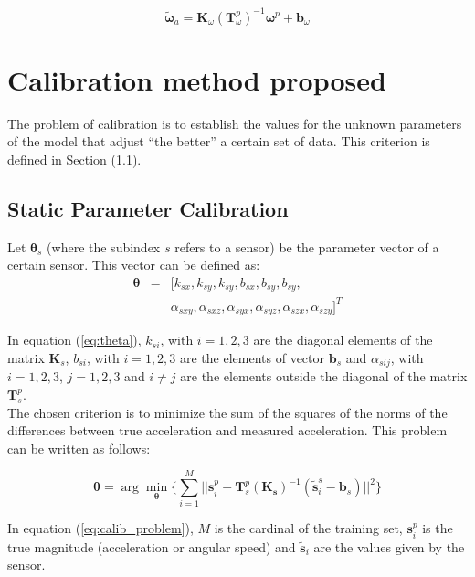 \documentclass[conference]{IEEEtran}
\newcommand{\refp}[1]{(\ref{#1})}
\begin{document}
\begin{equation}
\tilde{\boldsymbol{\omega}}_a = \mathbf{K}_{\omega}(\mathbf{T}_{\omega}^p)^{-1}\boldsymbol{\omega}^p+\mathbf{b}_{\omega}
\end{equation}

\section{Calibration method proposed}
The problem of calibration is to establish the values for the unknown parameters of the model that adjust ``the better'' a certain set of data. This criterion is defined in Section \refp{sec:param}. 


\subsection{Static Parameter Calibration}
\label{sec:param}

Let $\boldsymbol{\theta}_s$ (where the subindex $s$ refers to a sensor) be the parameter vector of a certain sensor. This vector can be defined as:
\begin{eqnarray}
\boldsymbol{\theta} &=& [k_{sx},k_{sy},k_{sy},b_{sx},b_{sy},b_{sy},\\ \nonumber
&&\alpha_{sxy},\alpha_{sxz},\alpha_{syx},\alpha_{syz},\alpha_{szx},\alpha_{szy}]^T
\label{eq:theta}
\end{eqnarray}

In equation \refp{eq:theta}, $k_{si}$, with $i=1,2,3$ are the diagonal elements of the matrix $\mathbf{K}_s$, $b_{si}$, with $i = 1,2,3$ are the elements of vector $\mathbf{b}_s$ and $\alpha_{sij}$, with $i = 1,2,3$, $j = 1,2,3$ and $i \neq j$ are the elements outside the diagonal of the matrix $\mathbf{T}_s^p$.\\

The chosen criterion is to minimize the sum of the squares of the norms of the differences between true acceleration and measured acceleration. This problem can be written as follows:

\begin{equation}
\boldsymbol{\theta} = \arg \min_{\boldsymbol{\theta}} \lbrace \sum_{i = 1}^M ||\mathbf{s}_i^p - \mathbf{T}_s^p(\mathbf{K_s})^{-1}(\tilde{\mathbf{s}}_i^s-\mathbf{b}_s) ||^2 \rbrace
\label{eq:calib_problem}
\end{equation}

In equation \refp{eq:calib_problem}, $M$ is the cardinal of the training set, $\mathbf{s}_i^p$ is the true magnitude (acceleration or angular speed) and $\tilde{\mathbf{s}}_i$ are the values given by the sensor.\\
\end{document}

